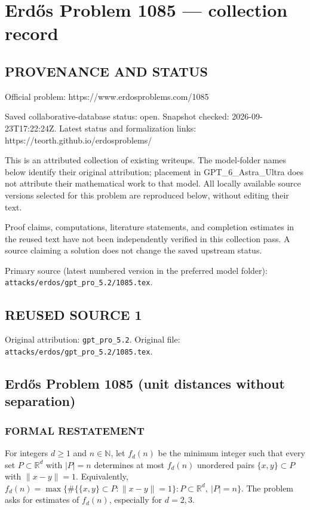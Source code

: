 \section*{Erd\H{o}s Problem 1085 --- collection record}

\subsection*{PROVENANCE AND STATUS}
Official problem: https://www.erdosproblems.com/1085

Saved collaborative-database status: open.
Snapshot checked: 2026-09-23T17:22:24Z.
Latest status and formalization links: https://teorth.github.io/erdosproblems/

This is an attributed collection of existing writeups. The model-folder names below identify their original attribution; placement in GPT\_6\_Astra\_Ultra does not attribute their mathematical work to that model. All locally available source versions selected for this problem are reproduced below, without editing their text.

Proof claims, computations, literature statements, and completion estimates in the reused text have not been independently verified in this collection pass. A source claiming a solution does not change the saved upstream status.

Primary source (latest numbered version in the preferred model folder): \texttt{attacks/erdos/gpt\_pro\_5.2/1085.tex}.

\subsection*{REUSED SOURCE 1}
Original attribution: \texttt{gpt\_pro\_5.2}.
Original file: \texttt{attacks/erdos/gpt\_pro\_5.2/1085.tex}.


\subsection*{Erd\H{o}s Problem 1085 (unit distances without separation)}

\subsubsection*{FORMAL RESTATEMENT}
For integers \(d\ge 1\) and \(n\in\mathbb{N}\), let \(f_d(n)\) be the minimum integer such that every set \(P\subset\mathbb{R}^d\) with \(|P|=n\) determines at most \(f_d(n)\) unordered pairs \(\{x,y\}\subset P\) with \(\|x-y\|=1\).
Equivalently, \(f_d(n)=\max\{\#\{\{x,y\}\subset P:\|x-y\|=1\}: P\subset\mathbb{R}^d,\ |P|=n\}\).
The problem asks for estimates of \(f_d(n)\), especially for \(d=2,3\).

